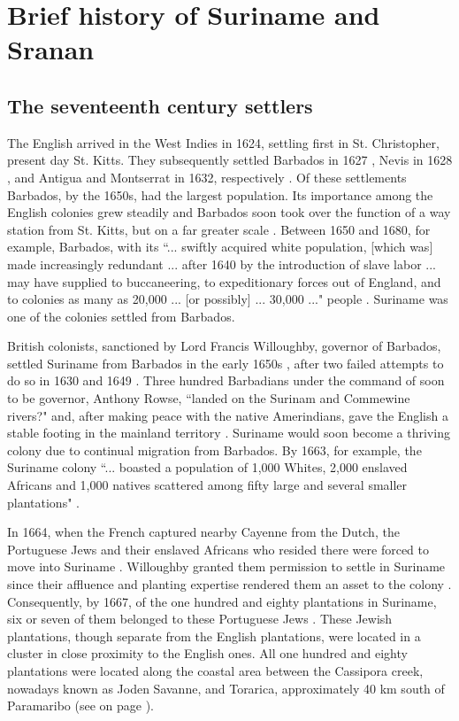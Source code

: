 
\section{Brief history of Suriname and Sranan} \label{1.2}
\subsection{The seventeenth century settlers} \label{1.2.1}

The English arrived in the West Indies in 1624, settling first in St. Christopher, present day St. Kitts. They subsequently settled Barbados in 1627  \citep[18]{Dunn73}, Nevis in 1628  \citep[297]{Wroughton06}, and Antigua and Montserrat in 1632, respectively \citep[27]{Forsyth69}. Of these settlements Barbados, by the 1650s, had the largest population. Its importance among the English colonies grew steadily and Barbados soon took over the function of a way station from St. Kitts, but on a far greater scale \citep{Davies74}. Between 1650 and 1680, for example, Barbados, with its ``... swiftly acquired white population, [which was] made increasingly redundant ... after 1640 by the introduction of slave labor ... may have supplied to buccaneering, to expeditionary forces out of England, and to colonies as many as 20,000 ... [or possibly] ... 30,000 ..." people \citep[137]{Davies74}. Suriname was one of the colonies settled from Barbados.

British colonists, sanctioned by Lord Francis Willoughby, governor of Barbados, settled Suriname from Barbados in the early 1650s \citep{Ehrlich09, Arbell02, Hyamson08}, after two failed attempts to do so in 1630 and 1649 \citep[82]{Arbell02}. Three hundred Barbadians under the command of soon to be governor, Anthony Rowse, ``landed on the Surinam and Commewine rivers?" and, after making peace with the native Amerindians, gave the English a stable footing in the mainland territory \citep[414]{Salomon99}. Suriname would soon become a thriving colony due to continual migration from Barbados. By 1663, for example, the Suriname colony ``... boasted a population of 1,000 Whites, 2,000 enslaved Africans and 1,000 natives scattered among fifty large and several smaller plantations" \citep[808]{Marley05}.

In 1664, when the French captured nearby Cayenne from the Dutch, the Portuguese Jews and their enslaved Africans who resided there were forced to move into Suriname \citep{Redfield00, Friedman99}. Willoughby granted them permission to settle in Suriname since their affluence and planting expertise rendered them an asset to the colony \citep{Ehrlich09}. Consequently, by 1667, of the one hundred and eighty plantations in Suriname, six or seven of them belonged to these Portuguese Jews \citep{Arbell02, Rens53}. These Jewish plantations, though separate from the English plantations, were located in a cluster in close proximity to the English ones. All one hundred and eighty plantations were located along the coastal area between the Cassipora creek, nowadays known as Joden Savanne, and Torarica, approximately 40 km south of Paramaribo (see  on page \pageref{Map1.1}).

